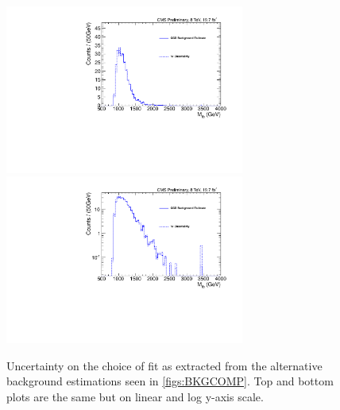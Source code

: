 \begin{figure}[htcb]
\begin{center}
\includegraphics[width=0.7\textwidth]{AN-13-004/figs/BKGFITERR.pdf}\\
\includegraphics[width=0.7\textwidth]{AN-13-004/figs/BKGFITERRLOG.pdf}
\caption{
Uncertainty on the choice of fit as extracted from the alternative background estimations seen in \ref{figs:BKGCOMP}. Top and bottom plots are the same but on linear and log y-axis scale.
}
\label{figs:BKGERR}
\end{center}
\end{figure}

